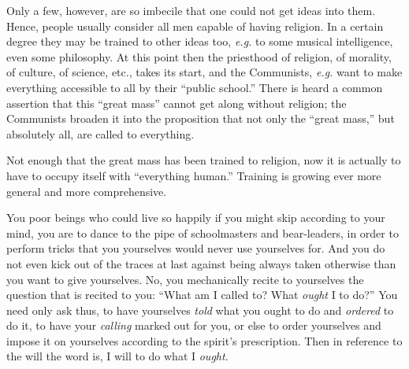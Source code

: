 Only a few, however, are so imbecile that one could not get ideas into them. 
Hence, people usually consider all men capable of having religion. In a 
certain degree they may be trained to other ideas too, \textit{e.g.} to some 
musical intelligence, even some philosophy. At this point then the priesthood 
of religion, of morality, of culture, of science, etc., takes its start, and 
the Communists, \textit{e.g.} want to make everything accessible to all by 
their ``public school.'' There is heard a common assertion that this 
``great mass'' cannot get along without religion; the Communists broaden it 
into the proposition that not only the ``great mass,'' but absolutely all, 
are called to everything.

Not enough that the great mass has been trained to religion, now it is 
actually to have to occupy itself with ``everything human.'' Training is 
growing ever more general and more comprehensive.

You poor beings who could live so happily if you might skip according to your 
mind, you are to dance to the pipe of schoolmasters and bear-leaders, in order 
to perform tricks that you yourselves would never use yourselves for. And you 
do not even kick out of the traces at last against being always taken 
otherwise than you want to give yourselves. No, you mechanically recite to 
yourselves the question that is recited to you: ``What am I called to? What 
\textit{ought} I to do?'' You need only ask thus, to have yourselves 
\textit{told} what you ought to do and \textit{ordered} to do it, to have your 
\textit{calling} marked out for you, or else to order yourselves and impose it 
on yourselves according to the spirit's prescription. Then in reference to the 
will the word is, I will to do what I \textit{ought}.

